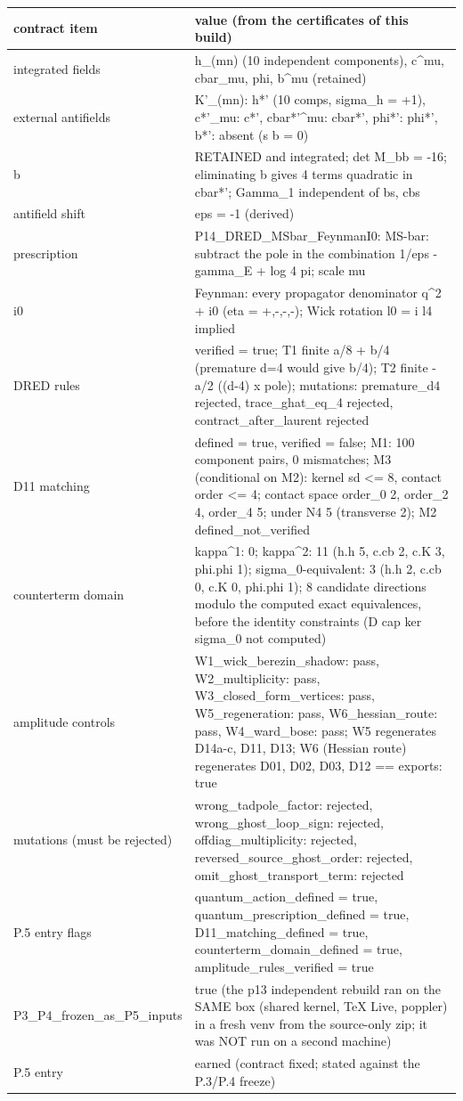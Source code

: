 \begin{center}\small
\begin{tabular}{@{}p{5.2cm}p{10.3cm}@{}}
\toprule contract item & value (from the certificates of this build)\\ \midrule
integrated fields & h\_(mn) (10 independent components), c\^{}mu, cbar\_mu, phi, b\^{}mu (retained) \\
external antifields & K'\_(mn): h*' (10 comps, sigma\_h = +1), c*'\_mu: c*', cbar*'\^{}mu: cbar*', phi*': phi*', b*': absent (s b = 0) \\
b & RETAINED and integrated; det M\_bb = -16; eliminating b gives 4 terms quadratic in cbar*'; Gamma\_1 independent of bs, cbs \\
antifield shift & eps = -1 (derived) \\
prescription & P14\_DRED\_MSbar\_FeynmanI0: MS-bar: subtract the pole in the combination 1/eps - gamma\_E + log 4 pi; scale mu \\
i0 & Feynman: every propagator denominator q\^{}2 + i0 (eta = +,-,-,-); Wick rotation l0 = i l4 implied \\
DRED rules & verified = true; T1 finite a/8 + b/4 (premature d=4 would give b/4); T2 finite -a/2 ((d-4) x pole); mutations: premature\_d4 rejected, trace\_ghat\_eq\_4 rejected, contract\_after\_laurent rejected \\
D11 matching & defined = true, verified = false; M1: 100 component pairs, 0 mismatches; M3 (conditional on M2): kernel sd \textless{}= 8, contact order \textless{}= 4; contact space order\_0 2, order\_2 4, order\_4 5; under N4 5 (transverse 2); M2 defined\_not\_verified \\
counterterm domain & kappa\^{}1: 0; kappa\^{}2: 11 (h.h 5, c.cb 2, c.K 3, phi.phi 1); sigma\_0-equivalent: 3 (h.h 2, c.cb 0, c.K 0, phi.phi 1); 8 candidate directions modulo the computed exact equivalences, before the identity constraints (D cap ker sigma\_0 not computed) \\
amplitude controls & W1\_wick\_berezin\_shadow: pass, W2\_multiplicity: pass, W3\_closed\_form\_vertices: pass, W5\_regeneration: pass, W6\_hessian\_route: pass, W4\_ward\_bose: pass; W5 regenerates D14a-c, D11, D13; W6 (Hessian route) regenerates D01, D02, D03, D12 == exports: true \\
mutations (must be rejected) & wrong\_tadpole\_factor: rejected, wrong\_ghost\_loop\_sign: rejected, offdiag\_multiplicity: rejected, reversed\_source\_ghost\_order: rejected, omit\_ghost\_transport\_term: rejected \\
P.5 entry flags & quantum\_action\_defined = true, quantum\_prescription\_defined = true, D11\_matching\_defined = true, counterterm\_domain\_defined = true, amplitude\_rules\_verified = true \\
P3\_P4\_frozen\_as\_P5\_inputs & true (the p13 independent rebuild ran on the SAME box (shared kernel, TeX Live, poppler) in a fresh venv from the source-only zip; it was NOT run on a second machine) \\
P.5 entry & earned (contract fixed; stated against the P.3/P.4 freeze) \\
\bottomrule
\end{tabular}
\end{center}

